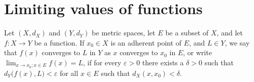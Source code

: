 \section{Limiting values of functions}\label{sec 3.1}

\begin{definition}\label{3.1.1}
    Let \((X, d_X)\) and \((Y, d_Y)\) be metric spaces, let \(E\) be a subset of \(X\), and let \(f : X \to Y\) be a function.
    If \(x_0 \in X\) is an adherent point of \(E\), and \(L \in Y\), we say that \(f(x)\) converges to \(L\) in \(Y\) as \(x\) converges to \(x_0\) in \(E\), or write \(\lim_{x \to x_0 ; x \in E} f(x) = L\), if for every \(\varepsilon > 0\) there exists a \(\delta > 0\) such that \(d_Y\big(f(x), L\big) < \varepsilon\) for all \(x \in E\) such that \(d_X(x, x_0) < \delta\).
\end{definition}